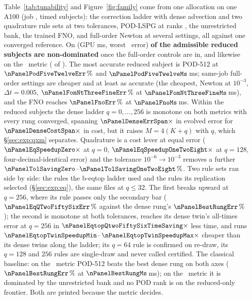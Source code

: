 Table~\ref{tab:tunability} and Figure~\ref{fig:family} come from one
allocation on one A100 (job \provPanelJob, \nPanelSubjectCount{} timed
subjects): the correction ladder with dense advection and two quadrature rule
sets at two tolerances, POD-LSPG at ranks \nPanelPodRanks, the unrestricted
bank, the trained FNO, and full-order Newton at several settings, all against
one converged reference. On (GPU ms, worst \evolved\ error)
\textbf{\nPanelReducedNonDomEvolved{} of the \nPanelReducedCount{} admissible
reduced subjects are non-dominated} once the full-order controls are in, and
likewise on the \alltimes\ metric (\nPanelReducedNonDomAll{} of
\nPanelReducedCount). The most accurate reduced subject is POD-512 at
$\nPanelPodFiveTwelveErr\,\%$ and $\nPanelPodFiveTwelveMs$\,ms;
\nPanelFomBeatingMostAccurate{} same-job full-order settings are cheaper and
at least as accurate (the cheapest, Newton at $10^{-3}$, $\Delta t=0.005$,
$\nPanelFomNtThreeFineErr\,\%$ at $\nPanelFomNtThreeFineMs$\,ms), and the FNO
reaches $\nPanelFnoErr\,\%$ at $\nPanelFnoMs$\,ms. Within the reduced
subjects the dense ladder $q=0,\dots,256$ is monotone on both metrics with
every rung converged, spanning $\nPanelDenseErrSpan\times$ in evolved error
for $\nPanelDenseCostSpan\times$ in cost, but it raises $M=4(K+q)$ with $q$,
which \S\ref{sec:exp:qxm} separates. Quadrature is a cost lever at equal
error ($\nPanelEqSpeedupZero\times$ at $q=0$,
$\nPanelEqSpeedupOneTwoEight\times$ at $q=128$, four-decimal-identical error)
and the tolerance $10^{-6}\to10^{-3}$ removes a further
$\nPanelTolSavingZero$--$\nPanelTolSavingOneTwoEight\,\%$. Two rule sets ran
side by side: the rules the b-eqtop ladder used and the rules its replication
selected (\S\ref{sec:exp:eq}), the same files at $q\le32$. The first breaks
upward at $q=256$, where its rule passes only the secondary bar
($\nPanelEqQTwoFiftySixErr\,\%$ against the dense rung's
$\nPanelBestRungErr\,\%$); the second is monotone at both tolerances, reaches
its dense twin's all-times error at $q=256$ in
$\nPanelEqtopQtwoFiftySixTimeSaving\times$ less time, and runs
$\nPanelEqtopTwinSpeedupMin$--$\nPanelEqtopTwinSpeedupMax\times$ cheaper than
its dense twins along the ladder; its $q=64$ rule is confirmed on re-draw, its
$q=128$ and $256$ rules are single-draw and never called certified. The
classical baseline: on the \evolved\ metric POD-512 beats the best dense rung
on both axes ($\nPanelBestRungErr\,\%$ at $\nPanelBestRungMs$\,ms); on the
\alltimes\ metric it is dominated by the unrestricted bank and no POD rank is
on the reduced-only frontier. Both are printed because the metric decides.

